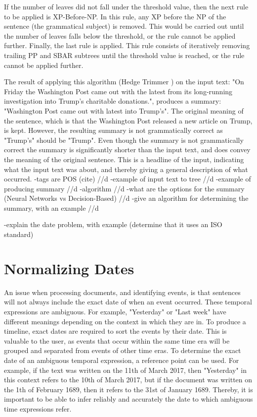 \par If the number of leaves did not fall under the threshold value, then the next rule to be applied is XP-Before-NP. In this rule, any XP before the NP of the sentence (the grammatical subject) is removed. This would be carried out until the number of leaves falls below the threshold, or the rule cannot be applied further. Finally, the last rule is applied.  This rule consists of iteratively removing trailing PP and SBAR subtrees until the threshold value is reached, or the rule cannot be applied further. 
\par The result of applying this algorithm (Hedge Trimmer  \cite{dorrzajicschwartz2003}) on the input text: "On Friday the Washington Post came out with the latest from its long-running investigation into Trump's charitable donations.", produces a summary: "Washington Post came out with latest into Trump's". The original meaning of the sentence, which is that the Washington Post released a new article on Trump, is kept. However, the resulting summary is not grammatically correct as "Trump's" should be "Trump". Even though the summary is not grammatically correct the summary is significantly shorter than the input text, and does convey the meaning of the original sentence. This is a headline of the input, indicating what the input text was about, and thereby giving a general description of what occurred.
-tags are POS (cite) //d
-example of input text to tree //d
-example of producing summary //d 
-algorithm //d 
-what are the options for the summary (Neural Networks vs Decision-Based) //d
-give an algorithm for determining the summary, with an example //d

-explain the date problem, with example (determine that it uses an ISO standard)
\section{Normalizing Dates}
\par An issue when processing documents, and identifying events, is that sentences will not always include the exact date of when an event occurred. These temporal expressions are ambiguous. For example, "Yesterday" or "Last week" have different meanings depending on the context in which they are in. To produce a timeline, exact dates are required to sort the events by their date. This is valuable to the user, as events that occur within the same time era will be grouped and separated from events of other time eras. To determine the exact date of an ambiguous temporal expression, a reference point can be used. For example, if the text was written on the 11th of March 2017, then "Yesterday" in this context refers to the 10th of March 2017, but if the document was written on the 1th of February 1689, then it refers to the 31st of January 1689. Thereby, it is important to be able to infer reliably and accurately the date to which ambiguous time expressions refer. 

